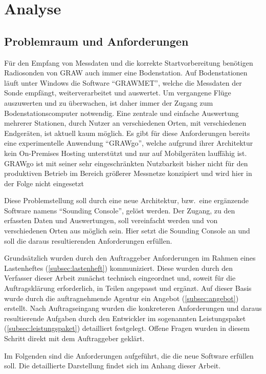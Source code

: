 \section{Analyse}

\subsection{Problemraum und Anforderungen}
Für den Empfang von Messdaten und die korrekte Startvorbereitung benötigen Radiosonden von GRAW auch immer eine Bodenstation.
Auf Bodenstationen läuft unter Windows die Software \enquote{GRAWMET}\cite{grawmet}, welche die Messdaten der Sonde empfängt, weiterverarbeitet und auswertet.
Um vergangene Flüge auszuwerten und zu überwachen, ist daher immer der Zugang zum Bodenstationscomputer notwendig.
Eine zentrale und einfache Auswertung mehrerer Stationen, durch Nutzer an verschiedenen Orten, mit verschiedenen Endgeräten, ist aktuell kaum möglich.
Es gibt für diese Anforderungen bereits eine experimentelle Anwendung \enquote{GRAWgo}\cite{grawgo}, welche aufgrund ihrer Architektur kein On-Premises Hosting unterstützt und nur auf Mobilgeräten lauffähig ist.
GRAWgo ist mit seiner sehr eingeschränkten Nutzbarkeit bisher nicht für den produktiven Betrieb im Bereich größerer Messnetze konzipiert und wird hier in der Folge nicht eingesetzt

Diese Problemstellung soll durch eine neue Architektur, bzw.\ eine ergänzende Software namens \enquote{Sounding Console}, gelöst werden.
Der Zugang, zu den erfassten Daten und Auswertungen, soll vereinfacht werden und von verschiedenen Orten aus möglich sein.
Hier setzt die Sounding Console an und soll die daraus resultierenden Anforderungen erfüllen.

Grundsätzlich wurden durch den Auftraggeber Anforderungen im Rahmen eines Lastenheftes (\ref{subsec:lastenheft}) kommuniziert.
Diese wurden durch den Verfasser dieser Arbeit zunächst technisch eingeordnet und, soweit für die Auftragsklärung erforderlich, in Teilen angepasst und ergänzt.
Auf dieser Basis wurde durch die auftragnehmende Agentur ein Angebot (\ref{subsec:angebot}) erstellt.
Nach Auftragseingang wurden die konkreteren Anforderungen und daraus resultierende Aufgaben durch den Entwickler im sogenannten Leistungspaket (\ref{subsec:leistungspaket}) detailliert festgelegt.
Offene Fragen wurden in diesem Schritt direkt mit dem Auftraggeber geklärt.

Im Folgenden sind die Anforderungen aufgeführt, die die neue Software erfüllen soll.
Die detaillierte Darstellung findet sich im Anhang dieser Arbeit.

